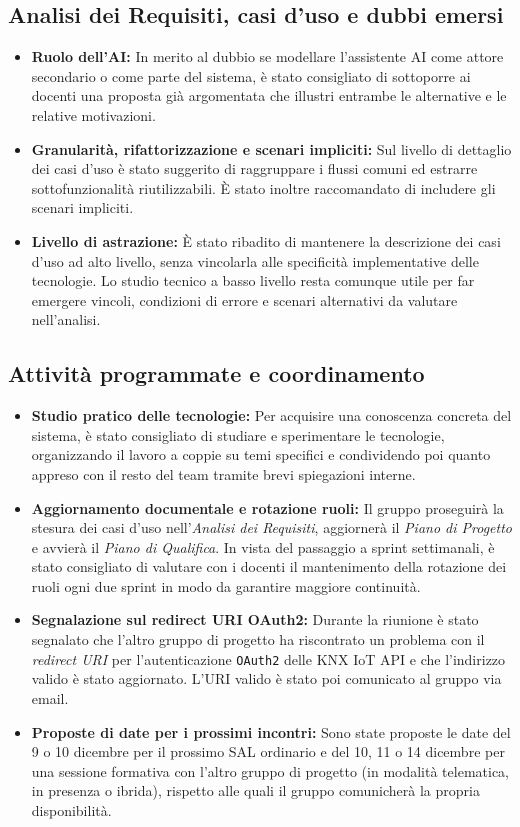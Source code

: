 \documentclass[11pt, a4paper]{article}
\begin{document}
\subsection{Analisi dei Requisiti, casi d'uso e dubbi emersi}
\begin{itemize}
    \item \textbf{Ruolo dell'AI:} In merito al dubbio se modellare l'assistente AI come attore secondario o come parte del sistema, è stato consigliato di sottoporre ai docenti una proposta già argomentata che illustri entrambe le alternative e le relative motivazioni.
    \item \textbf{Granularità, rifattorizzazione e scenari impliciti:} Sul livello di dettaglio dei casi d'uso è stato suggerito di raggruppare i flussi comuni ed estrarre sottofunzionalità riutilizzabili. È stato inoltre raccomandato di includere gli scenari impliciti.
    \item \textbf{Livello di astrazione:} È stato ribadito di mantenere la descrizione dei casi d'uso ad alto livello, senza vincolarla alle specificità implementative delle tecnologie. Lo studio tecnico a basso livello resta comunque utile per far emergere vincoli, condizioni di errore e scenari alternativi da valutare nell'analisi.
\end{itemize}

\subsection{Attività programmate e coordinamento}
\begin{itemize}
    \item \textbf{Studio pratico delle tecnologie:} Per acquisire una conoscenza concreta del sistema, è stato consigliato di studiare e sperimentare le tecnologie, organizzando il lavoro a coppie su temi specifici e condividendo poi quanto appreso con il resto del team tramite brevi spiegazioni interne.
    \item \textbf{Aggiornamento documentale e rotazione ruoli:} Il gruppo proseguirà la stesura dei casi d'uso nell'\textit{Analisi dei Requisiti}, aggiornerà il \textit{Piano di Progetto} e avvierà il \textit{Piano di Qualifica}. In vista del passaggio a sprint settimanali, è stato consigliato di valutare con i docenti il mantenimento della rotazione dei ruoli ogni due sprint in modo da garantire maggiore continuità.
    \item \textbf{Segnalazione sul redirect URI OAuth2:} Durante la riunione è stato segnalato che l'altro gruppo di progetto ha riscontrato un problema con il \textit{redirect URI} per l'autenticazione \texttt{OAuth2} delle KNX IoT API e che l'indirizzo valido è stato aggiornato. L'URI valido è stato poi comunicato al gruppo via email.
    \item \textbf{Proposte di date per i prossimi incontri:} Sono state proposte le date del 9 o 10 dicembre per il prossimo SAL ordinario e del 10, 11 o 14 dicembre per una sessione formativa con l'altro gruppo di progetto (in modalità telematica, in presenza o ibrida), rispetto alle quali il gruppo comunicherà la propria disponibilità.
\end{itemize}
\end{document}
